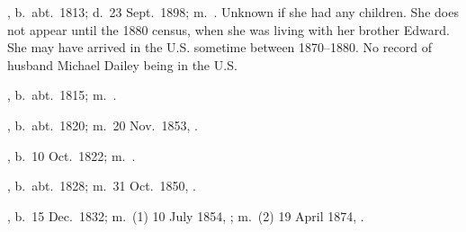 \begin{Kids}
	, b.\ abt.\ 1813;\cite{1880CensusAnn} d.\ 23 Sept.\ 1898;\cite{Ann2OBrienDeath} m.\ .\cite{Ann2OBrienDeath} Unknown if she had any children. She does not appear until the 1880 census, when she was living with her brother Edward. She may have arrived in the U.S. sometime between 1870--1880. No record of husband Michael Dailey being in the U.S.
	
	, b.\ abt.\ 1815; m.\ .
	
	, b.\ abt.\ 1820; m.\ 20 Nov.\ 1853, .
	
	, b.\ 10 Oct.\ 1822; m.\ .
		
	, b.\ abt.\ 1828; m.\ 31 Oct.\ 1850, .
	
	, b.\ 15 Dec.\ 1832; m.\ (1) 10 July 1854, ; m.\ (2) 19 April 1874, .
			
\end{Kids}
